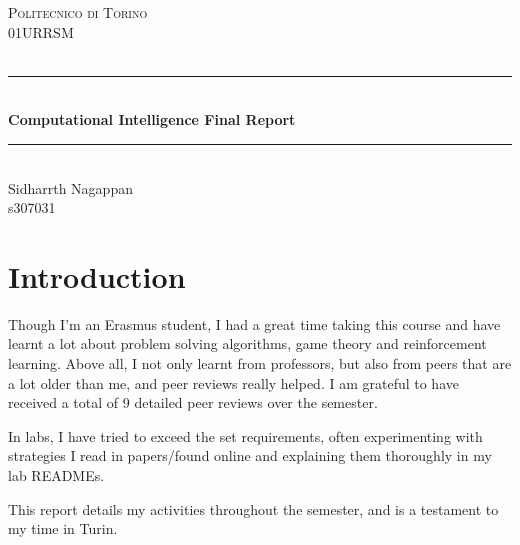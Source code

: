 \documentclass[12pt]{article}
\begin{document}
\begin{titlepage}

\newcommand{\HRule}{\rule{\linewidth}{0.5mm}} 							%
\center 
 
\textsc{\LARGE Politecnico di Torino}\\[1cm]

\textsc{\Large 01URRSM}\\[0.2cm]
\textsc{\large }\\[1cm] 										%
\HRule \\[0.8cm]
{ \huge \bfseries Computational Intelligence Final Report}\\[0.7cm]								%
\HRule \\[2cm]
\Large
Sidharrth Nagappan\\[0.5cm] 										%
s307031

\vfill 
\end{titlepage}

\tableofcontents

\newpage


\section{Introduction}

\large

Though I'm an Erasmus student, I had a great time taking this course and have learnt a lot about problem solving algorithms, game theory and reinforcement learning. Above all, I not only learnt from professors, but also from peers that are a lot older than me, and peer reviews really helped. I am grateful to have received a total of 9 detailed peer reviews over the semester.

In labs, I have tried to exceed the set requirements, often
experimenting with strategies I read in papers/found online and explaining them thoroughly in my lab READMEs.

This report details my activities throughout the semester, and is a testament to my time in Turin.
\end{document}
